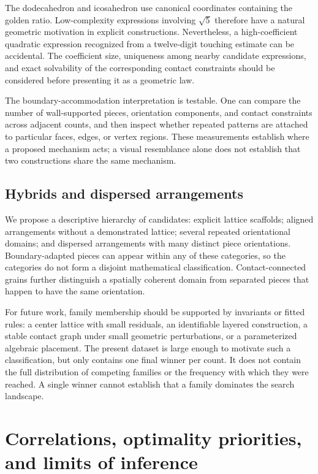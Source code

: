 \documentclass[11pt,a4paper]{article}
\begin{document}
The dodecahedron and icosahedron use canonical coordinates containing the golden ratio. Low-complexity expressions involving $\sqrt5$ therefore have a natural geometric motivation in explicit constructions. Nevertheless, a high-coefficient quadratic expression recognized from a twelve-digit touching estimate can be accidental. The coefficient size, uniqueness among nearby candidate expressions, and exact solvability of the corresponding contact constraints should be considered before presenting it as a geometric law.

The boundary-accommodation interpretation is testable. One can compare the number of wall-supported pieces, orientation components, and contact constraints across adjacent counts, and then inspect whether repeated patterns are attached to particular faces, edges, or vertex regions. These measurements establish where a proposed mechanism acts; a visual resemblance alone does not establish that two constructions share the same mechanism.

\subsection{Hybrids and dispersed arrangements}

We propose a descriptive hierarchy of candidates: explicit lattice scaffolds; aligned arrangements without a demonstrated lattice; several repeated orientational domains; and dispersed arrangements with many distinct piece orientations. Boundary-adapted pieces can appear within any of these categories, so the categories do not form a disjoint mathematical classification. Contact-connected grains further distinguish a spatially coherent domain from separated pieces that happen to have the same orientation.

For future work, family membership should be supported by invariants or fitted rules: a center lattice with small residuals, an identifiable layered construction, a stable contact graph under small geometric perturbations, or a parameterized algebraic placement. The present dataset is large enough to motivate such a classification, but only contains one final winner per count. It does not contain the full distribution of competing families or the frequency with which they were reached. A single winner cannot establish that a family dominates the search landscape.

\section{Correlations, optimality priorities, and limits of inference}
\end{document}
